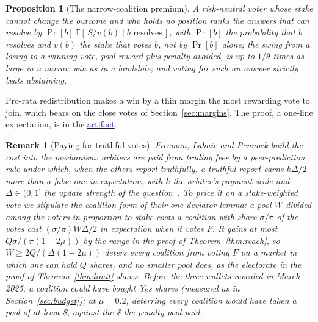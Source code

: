 \documentclass[conference,compsoc]{IEEEtran}
\newcommand{\artifactlink}[1]{\texorpdfstring{\href{https://github.com/submissionrepo/too-big-to-vote-on-artifact}{\textcolor{blue}{#1}}}{#1}}
\newtheorem{proposition}{Proposition}
\newtheorem{remark}{Remark}
\newcommand{\muparam}{\mu}
\begin{document}
\begin{proposition}[The narrow-coalition premium]
\label{prop:premium}
A risk-neutral voter whose stake cannot change the outcome and who holds no position ranks the answers that can resolve by $\Pr[b]\, \mathbb{E}[\,S / v(b) \mid b \text{ resolves}\,]$, with $\Pr[b]$ the probability that $b$ resolves and $v(b)$ the stake that votes $b$, not by $\Pr[b]$ alone; the swing from a losing to a winning vote, pool reward plus penalty avoided, is up to $1/\theta$ times as large in a narrow win as in a landslide; and voting for such an answer strictly beats abstaining.
\end{proposition}
Pro-rata redistribution makes a win by a thin margin the most rewarding vote to join, which bears on the close votes of Section~\ref{sec:margins}. The proof, a one-line expectation, is in the \artifactlink{artifact}.

\begin{remark}[Paying for truthful votes]
\label{rem:fees}
 Freeman, Lahaie and Pennock build the cost into the mechanism: arbiters are paid from trading fees by a peer-prediction rule under which, when the others report truthfully, a truthful report earns $k\Delta/2$ more than a false one in expectation, with $k$ the arbiter's payment scale and $\Delta \in (0, 1]$ the update strength of the question~\cite{freeman2017}. To price it on a stake-weighted vote we stipulate the coalition form of their one-deviator lemma: a pool $W$ divided among the voters in proportion to stake costs a coalition with share $\sigma/\pi$ of the votes cast $(\sigma/\pi)W\Delta/2$ in expectation when it votes $F$. It gains at most $Q\sigma/(\pi(1 - 2\muparam))$ by the range in the proof of Theorem~\ref{thm:reach}, so $W \ge 2Q/(\Delta(1 - 2\muparam))$ deters every coalition from voting $F$ on a market in which one can hold $Q$ shares, and no smaller pool does, as the electorate in the proof of Theorem~\ref{thm:limit} shows. Before the three wallets revealed in March 2025, a coalition could have bought \freemanQMarch{} Yes shares (measured as in Section~\ref{sec:budget}); at $\muparam = 0.2$, deterring every coalition would have taken a pool of at least \$\freemanPoolMarch{}, against the \$\marchPoolUsd{} the penalty pool paid.
\end{remark}
\end{document}
